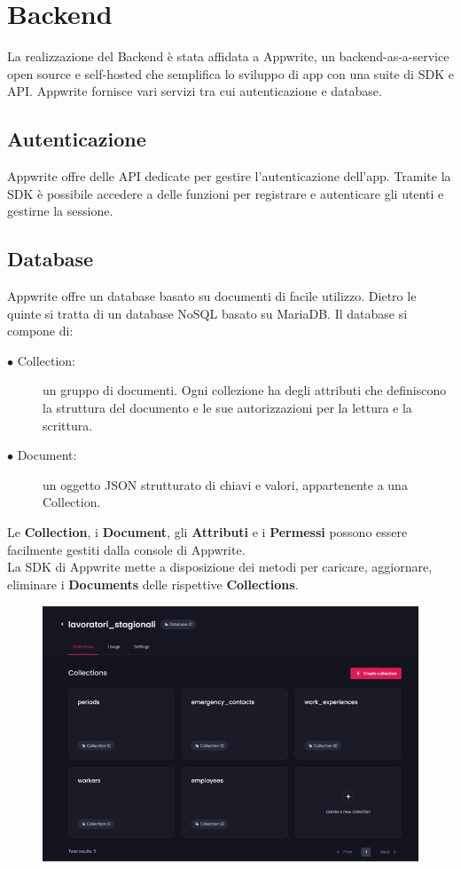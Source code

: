 \documentclass[a4paper, oneside, 12pt]{book}
\begin{document}
\section{Backend}
La realizzazione del Backend è stata affidata a Appwrite, un backend-as-a-service open source e self-hosted che semplifica lo sviluppo
di app con una suite di SDK e API. Appwrite fornisce vari servizi tra cui autenticazione e database.

\subsection{Autenticazione}
Appwrite offre delle API dedicate per gestire l’autenticazione dell’app. Tramite la SDK è possibile accedere a delle funzioni per 
registrare e autenticare gli utenti e gestirne la sessione.

\subsection{Database}
Appwrite offre un database basato su documenti di facile utilizzo. Dietro le quinte si tratta di un database NoSQL basato su MariaDB. 
Il database si compone di:

\begin{description}
	\item[$\bullet$ Collection:]un gruppo di documenti. Ogni collezione ha degli attributi che definiscono la struttura del documento e le sue 
	autorizzazioni per la lettura e la scrittura.
	\item[$\bullet$ Document:]un oggetto JSON strutturato di chiavi e valori, appartenente a una Collection.
\end{description}

Le \textbf{Collection}, i \textbf{Document}, gli \textbf{Attributi} e i \textbf{Permessi} possono essere facilmente gestiti dalla console di Appwrite. \\
La SDK di Appwrite mette a disposizione dei metodi per caricare, aggiornare, eliminare i \textbf{Documents} delle rispettive \textbf{Collections}.

\begin{figure}[H]
	\centering
	\includegraphics[width = 15 cm]{images/appwrite.png}
	\label{fig:interfaccia Appwrite}
\end{figure}
\end{document}
